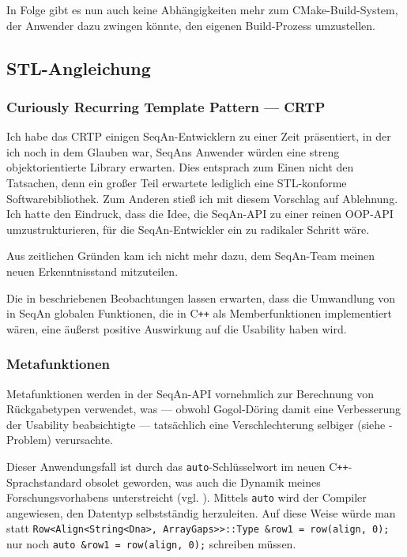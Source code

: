In Folge gibt es nun auch keine Abhängigkeiten mehr zum CMake-Build-System, der Anwender dazu zwingen könnte, den eigenen Build-Prozess umzustellen.



\subsection{STL-Angleichung}

\subsubsection{Curiously Recurring Template Pattern --- CRTP}

Ich habe das CRTP einigen SeqAn-Entwicklern zu einer Zeit präsentiert, in der ich noch in dem Glauben war, SeqAns Anwender würden eine streng objektorientierte Library erwarten. Dies entsprach zum Einen nicht den Tatsachen, denn ein großer Teil erwartete lediglich eine STL-konforme Softwarebibliothek. Zum Anderen stieß ich mit diesem Vorschlag auf Ablehnung. Ich hatte den Eindruck, dass die Idee, die SeqAn-API zu einer reinen OOP-API umzustrukturieren, für die SeqAn-Entwickler ein zu radikaler Schritt wäre.

Aus zeitlichen Gründen kam ich nicht mehr dazu, dem SeqAn-Team meinen neuen Erkenntnisstand mitzuteilen.

Die in  beschriebenen Beobachtungen lassen erwarten, dass die Umwandlung von in SeqAn globalen Funktionen, die in C\texttt{++} als Memberfunktionen implementiert wären, eine äußerst positive Auswirkung auf die Usability haben wird.

\subsubsection{Metafunktionen}

Metafunktionen werden in der SeqAn-API vornehmlich zur Berechnung von Rückgabetypen verwendet, was --- obwohl Gogol-Döring damit eine Verbesserung der Usability beabsichtigte --- tatsächlich eine Verschlechterung selbiger (siehe -Problem) verursachte.

Dieser Anwendungsfall ist durch das \texttt{auto}-Schlüsselwort im neuen C\texttt{++}-Sprachstandard obsolet geworden, was auch die Dynamik meines Forschungsvorhabens unterstreicht (vgl. ). Mittels \texttt{auto} wird der Compiler angewiesen, den Datentyp selbstständig herzuleiten. Auf diese Weise würde man statt \texttt{Row<Align<String<Dna>, ArrayGaps>>::Type &row1 = row(align, 0);} nur noch \texttt{auto &row1 = row(align, 0);} schreiben müssen.

